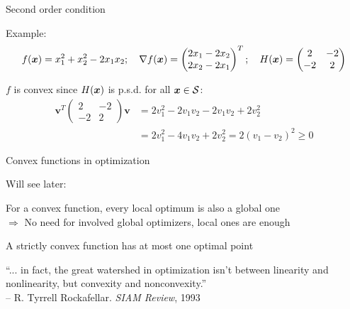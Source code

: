 \documentclass[11pt,compress,t,notes=noshow, xcolor=table]{beamer}
\begin{document}
\begin{framei}{Second order condition}
\item Example:
$$f(\bm{x}) = x_1^2 + x_2^2 - 2x_1x_2; \quad 
\nabla f(\bm{x}) = \begin{pmatrix}2x_1 - 2x_2 \\ 2x_2 - 2x_1\end{pmatrix}^T; \quad 
H(\bm{x}) = \begin{pmatrix} 2 & -2 \\ -2 & 2 \end{pmatrix}$$
\item $f$ is convex since $H(\bm{x})$ is p.s.d. for all $\bm{x}\in\mathcal{S}$:
\begin{align*}
\mathbf{v}^T\begin{pmatrix} 2 & -2 \\ -2 & 2 \end{pmatrix}\mathbf{v} &= 2v_1^2 - 2v_1v_2 -2v_1v_2 + 2v_2^2 \\
&= 2v_1^2 - 4v_1v_2 + 2v_2^2 = 2 (v_1 - v_2)^2 \ge 0
\end{align*}
\end{framei}


\begin{framei}{Convex functions in optimization}
\item Will see later:  
\item For a convex function, every local optimum is also a global one \\
$\Rightarrow$ No need for involved global optimizers, local ones are enough
\item A strictly convex function has at most one optimal point
\item \enquote{... in fact, the great watershed in optimization isn't between linearity and nonlinearity, but convexity and nonconvexity.}\\
-- R. Tyrrell Rockafellar. \textit{SIAM Review}, 1993
\end{framei}

\endlecture
\end{document}

